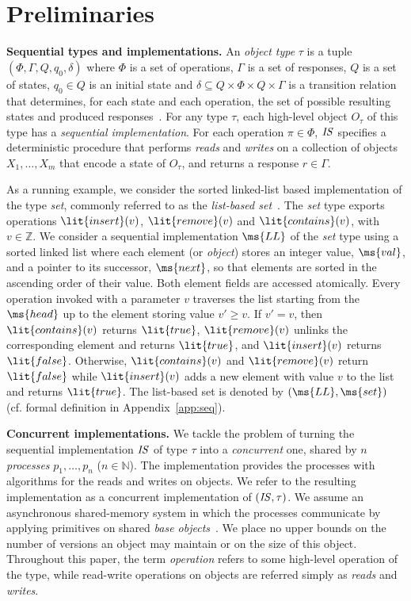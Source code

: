 \documentclass[11pt,pdftex,letterpaper]{article}
\def\Nat{\ensuremath{\mathbb{N}}}
\newcommand{\id}[1]{\mbox{\textit{#1}}}\newcommand{\res}[1]{\mbox{\textbf{#1}}}
\newcommand{\LL}{\ms{LL}}
\begin{document}
 \section{Preliminaries}
\label{sec:prel}
\vspace{1mm}\noindent\textbf{Sequential types and implementations.}
An \emph{object type} $\tau$ is a tuple
$(\Phi,\Gamma, Q, q_0, \delta)$ where
$\Phi$ is a set of operations,
$\Gamma$ is a set of responses, $Q$ is a set of states, $q_0\in Q$ is an
initial state and 
$\delta \subseteq Q\times \Phi \times Q\times \Gamma$ 
is a transition relation that determines, for each state
and each operation, the set of possible
resulting states and produced responses~\cite{AFHHT07}. 
For any type $\tau$, each high-level object $O_{\tau}$ of this type has a \emph{sequential implementation}. 
For each operation $\pi \in \Phi$, 
$\id{IS}$ specifies a deterministic procedure that 
performs \emph{reads} and \emph{writes} on a collection of objects
$X_1,\ldots , X_m$ that encode a state of $O_{\tau}$, and returns a response $r\in \Gamma$. 

As a running example, we consider the sorted linked-list based implementation of the type \emph{set}, commonly referred to 
as the \emph{list-based set}~\cite{HS08-book}.
The \emph{set} type exports operations $\lit{insert}(v)$, $\lit{remove}(v)$ and
$\lit{contains}(v)$, with $v\in\mathbb{Z}$.
We consider a sequential implementation $\LL$
of the \emph{set} type using a sorted linked list where 
each element (or \emph{object}) stores an integer value, $\ms{val}$, and a pointer to its successor, $\ms{next}$, so that elements are 
sorted in the ascending order of their value.  
Both element fields are accessed atomically.
Every operation invoked with a parameter $v$ traverses the list starting from the
$\ms{head}$ up to the element storing value $v'\geq v$.
If $v'=v$, then $\lit{contains}(v)$ returns $\lit{true}$, $\lit{remove}(v)$ unlinks the 
corresponding element and returns $\lit{true}$, and $\lit{insert}(v)$ returns $\lit{false}$. Otherwise, 
$\lit{contains}(v)$ and $\lit{remove}(v)$ return
$\lit{false}$ while $\lit{insert}(v)$ adds a new element with value
$v$ to the list and returns $\lit{true}$. 
The list-based set 
is denoted by $(\LL,\ms{set})$ (cf. formal definition in Appendix~\ref{app:seq}).

\vspace{1mm}\noindent\textbf{Concurrent implementations.}
We tackle the problem of turning the sequential
implementation $\id{IS}$ of type $\tau$ into a \emph{concurrent} one, shared by 
$n$ \emph{processes} $p_1,\ldots,p_n$ ($n\in\Nat$).
The implementation provides the processes with algorithms 
for the reads and writes on objects.
We refer to the resulting implementation as a concurrent implementation of $(\id{IS},\tau)$.
We assume an asynchronous shared-memory system in which the processes communicate by
applying primitives on shared \emph{base objects}~\cite{Her91}.
We place no upper bounds on the number of versions an object may maintain or on the size of this object.
Throughout this paper, the term \emph{operation} refers to some
high-level operation of the type, 
while read-write operations on objects are referred simply 
as \emph{reads} and \emph{writes}.
\end{document}
